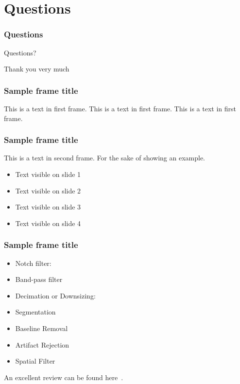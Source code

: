 \documentclass[aspectratio=169]{beamer}
\begin{document}
        \section{Questions}
    \begin{frame} %
        \frametitle{Questions}
        \begin{center}
        \LARGE Questions?
        \end{center}
    \end{frame}
    
    \begin{frame} %
        \begin{center}
        \LARGE Thank you very much
        \end{center}
    \end{frame}

\begin{frame}
\frametitle{Sample frame title}
This is a text in first frame. This is a text in first frame. This is a text in first frame.
\end{frame}


\begin{frame}
\frametitle{Sample frame title}
This is a text in second frame. 
For the sake of showing an example.
 
\begin{itemize}
 \item<1-> Text visible on slide 1
 \item<2-> Text visible on slide 2
 \item<3> Text visible on slide 3
 \item<4-> Text visible on slide 4
\end{itemize}
 
\end{frame}


\begin{frame}
\frametitle{Sample frame title}
\begin{itemize}
\item Notch filter:
\item Band-pass filter
\item Decimation or Downsizing:
\item Segmentation
\item Baseline Removal
\item Artifact Rejection
\item Spatial Filter
\end{itemize}
An excellent review can be found here~\cite{Simons2016}.
\end{frame}
\end{document}
